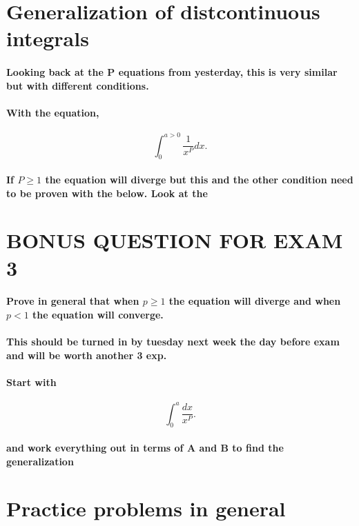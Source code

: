 \documentclass[a4paper]{article}
\begin{document}
\section{Generalization of distcontinuous integrals}%
\label{sec:Generalization of distcontinuous integrals}

\paragraph{Looking back at the P equations from yesterday, this is very similar but with different conditions.}
\paragraph{With the equation, }

\[
\int_{0}^{a>0} \frac{1}{x^{P}}dx
.\] 
\paragraph{If $P\ge 1$ the equation will diverge but this and the other condition need to be proven with the below. Look at the }
\section{BONUS QUESTION FOR EXAM 3}%
\label{sec:BONUS QUESTION FOR EXAM 3}
\paragraph{Prove in general that when $p\ge 1$ the equation will diverge and when $p<1$ the equation will converge.}
\paragraph{This should be turned in by tuesday next week the day before exam and will be worth another 3 exp.}

\paragraph{Start with}
\[
\int_{0}^{a} \frac{dx}{x^{P}}
.\] 
\paragraph{and work everything out in terms of A and B to find the generalization}

\section{Practice problems in general}%
\label{sec:Practice problems in general}
\end{document}
